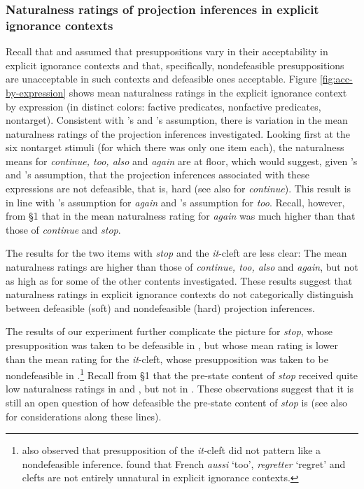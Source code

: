 \documentclass[11pt,fleqn]{article}
\newcommand{\6}{\mbox{$[\hspace*{-.6mm}[$}}
\newcommand{\9}{\mbox{$]\hspace*{-.6mm}]$}}
\newcommand{\citepos}[1]{\citeauthor{#1}'s \citeyear{#1}}
\begin{document}
\subsubsection{Naturalness ratings of projection inferences in explicit ignorance contexts}\label{s:analysis1}

Recall that \citealt{simons01} and \citealt{abusch10} assumed that presuppositions vary in their acceptability in explicit ignorance contexts and that, specifically, nondefeasible presuppositions are unacceptable in such contexts and defeasible ones  acceptable. Figure \ref{fig:acc-by-expression} shows mean naturalness ratings in the explicit ignorance context by expression (in distinct colors: \color{orange}factive predicates\color{black}, \color{black}nonfactive predicates\color{black}, \color{gray}nontarget\color{black}). Consistent with \citepos{simons01} and \citepos{abusch10} assumption, there is variation in the mean naturalness ratings of the projection inferences investigated. Looking first at the six nontarget stimuli (for which there was only one item each), the naturalness means for \emph{continue, too, also} and \emph{again} are at floor, which would suggest, given \citepos{simons01} and \citepos{abusch10} assumption, that the projection inferences associated with these expressions are not defeasible, that is, hard (see also \citealt[734ff.]{roberts-simons2024} for \emph{continue}). This result is in line with \citepos{simons01} assumption for \emph{again} and \citepos{abusch10} assumption for \emph{too}. Recall, however, from \S1 that in \citealt[Exp.~2]{kalomoiros-schwarz2024} the mean naturalness rating for \emph{again} was much higher than that those of \emph{continue} and \emph{stop}. 

The results for the two items with \emph{stop} and the \emph{it}-cleft are less clear: The mean naturalness ratings are higher than those of \emph{continue, too, also} and \emph{again}, but not as high as for some of the other contents investigated. These results suggest that naturalness ratings in explicit ignorance contexts do not categorically distinguish between defeasible (soft) and nondefeasible (hard) projection inferences. 

The results of our experiment further complicate the picture for \emph{stop}, whose presupposition was taken to be defeasible in \citealt{simons01}, but whose mean rating is lower than the mean rating for the \emph{it}-cleft, whose presupposition was taken to be nondefeasible in \citealt{abusch10}.\footnote{\citealt{smith-hall11} also observed that presupposition of the {\em it-}cleft did not pattern like a nondefeasible inference. \citealt{jayez-etal2015} found that French {\em aussi} `too', {\em regretter} `regret' and clefts are not entirely unnatural in explicit ignorance contexts.} Recall from \S1 that the pre-state content of \emph{stop} received quite low naturalness ratings in \citealt[Exp.~3]{mandelkern-etal2020} and \citealt[Exp.~2]{kalomoiros-schwarz2024}, but not in \citealt[Exp.~1]{kalomoiros-schwarz2024}. These observations suggest that it is still an open question of how defeasible the pre-state content of \emph{stop} is (see also \citealt[192f.]{abrusan2016} for considerations along these lines).
\end{document}

